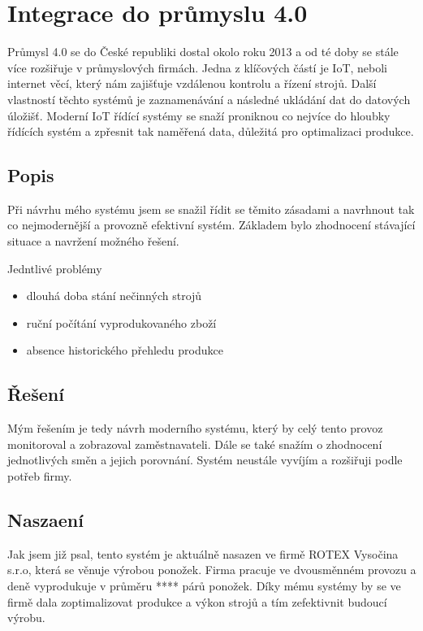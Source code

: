 \chapter{Integrace do průmyslu 4.0}
Průmysl 4.0 se do České republiki dostal okolo roku 2013 a od té doby se stále více rozšiřuje v průmyslových firmách.
Jedna z klíčových částí je IoT, neboli internet věcí, který nám zajišťuje vzdálenou kontrolu a řízení strojů.
Další vlastností těchto systémů je zaznamenávání a následné ukládání dat do datových úložišť.
Moderní IoT řídící systémy se snaží proniknou co nejvíce do hloubky řídících systém a zpřesnit tak naměřená data, důležitá pro optimalizaci produkce.   

\section{Popis}
Při návrhu mého systému jsem se snažil řídit se těmito zásadami a navrhnout tak co nejmodernější a provozně efektivní systém.
Základem bylo zhodnocení stávající situace a navržení možného řešení.

Jedntlivé problémy
\begin{itemize}
    \item dlouhá doba stání nečinných strojů
    \item ruční počítání vyprodukovaného zboží
    \item absence historického přehledu produkce
\end{itemize}

\section{Řešení}
Mým řešením je tedy návrh moderního systému, který by celý tento provoz monitoroval a zobrazoval zaměstnavateli.
Dále se také snažím o zhodnocení jednotlivých směn a jejich porovnání.
Systém neustále vyvíjím a rozšiřuji podle potřeb firmy.

\section{Naszaení}
Jak jsem již psal, tento systém je aktuálně nasazen ve firmě ROTEX Vysočina s.r.o\cite{ROTEX}, která se věnuje výrobou ponožek. 
Firma pracuje ve dvousměnném provozu a deně vyprodukuje v průměru **** párů ponožek.
Díky mému systémy by se ve firmě dala zoptimalizovat produkce a výkon strojů a tím zefektivnit budoucí výrobu. 

\fxnote[author=JA]{\textcolor{mygreen}{Obrázek pletárny}}

\newpage